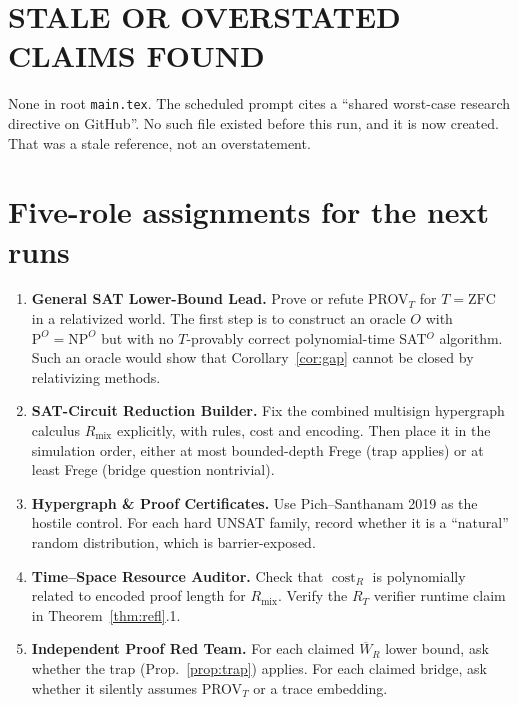 \documentclass[11pt]{article}
\theoremstyle{definition}
\theoremstyle{remark}
\newcommand{\cost}{\operatorname{cost}}
\newcommand{\Wb}{\overline W}
\begin{document}
\section{STALE OR OVERSTATED CLAIMS FOUND}
None in root \texttt{main.tex}. The scheduled prompt cites a ``shared worst-case
research directive on GitHub''. No such file existed before this run, and it is
now created. That was a stale reference, not an overstatement.

\section{Five-role assignments for the next runs}
\begin{enumerate}
\item \textbf{General SAT Lower-Bound Lead.} Prove or refute PROV$_T$ for
$T=\mathrm{ZFC}$ in a relativized world. The first step is to construct an
oracle $O$ with $\mathrm P^O=\mathrm{NP}^O$ but with no $T$-provably correct
polynomial-time SAT$^O$ algorithm. Such an oracle would show that
Corollary~\ref{cor:gap} cannot be closed by relativizing methods.
\item \textbf{SAT-Circuit Reduction Builder.} Fix the combined multisign
hypergraph calculus $R_{\mathrm{mix}}$ explicitly, with rules, cost and
encoding. Then place it in the simulation order, either at most bounded-depth
Frege (trap applies) or at least Frege (bridge question nontrivial).
\item \textbf{Hypergraph \& Proof Certificates.} Use Pich--Santhanam 2019 as
the hostile control. For each hard UNSAT family, record whether it is a
``natural'' random distribution, which is barrier-exposed.
\item \textbf{Time--Space Resource Auditor.} Check that $\cost_R$ is
polynomially related to encoded proof length for $R_{\mathrm{mix}}$. Verify the
$R_T$ verifier runtime claim in Theorem~\ref{thm:refl}.1.
\item \textbf{Independent Proof Red Team.} For each claimed $\Wb_R$ lower
bound, ask whether the trap (Prop.~\ref{prop:trap}) applies. For each claimed
bridge, ask whether it silently assumes PROV$_T$ or a trace embedding.
\end{enumerate}
\end{document}
